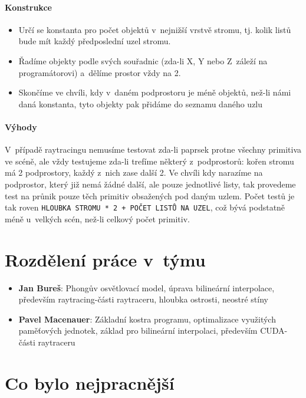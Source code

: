 \documentclass[12pt,a4paper,titlepage,final]{report}
\begin{document}
\paragraph{Konstrukce}
\begin{itemize}
	\item Určí se konstanta pro počet objektů v~nejnižší vrstvě stromu, tj. kolik listů bude mít každý předposlední uzel stromu.
	\item Řadíme objekty podle svých souřadnic (zda-li X, Y nebo Z~záleží na programátorovi) a~dělíme prostor vždy na 2.
	\item Skončíme ve chvíli, kdy v~daném podprostoru je méně objektů, než-li námi daná konstanta, tyto objekty pak přidáme do seznamu daného uzlu
\end{itemize}

\paragraph{Výhody} V~případě raytracingu nemusíme testovat zda-li paprsek protne všechny primitiva ve scéně, ale vždy testujeme zda-li trefíme některý z~podprostorů: kořen stromu má 2 podprostory, každý z~nich zase další 2. Ve chvíli kdy narazíme na podprostor, který již nemá žádné další, ale pouze jednotlivé listy, tak provedeme test na průnik pouze těch primitiv obsažených pod daným uzlem. Počet testů je tak roven \verb|HLOUBKA STROMU * 2 + POČET LISTŮ NA UZEL|, což bývá podstatně méně u~velkých scén, než-li celkový počet primitiv.


\section{Rozdělení práce v~týmu}

\begin{itemize}
\item \textbf{Jan Bureš}: Phongův osvětlovací model, úprava bilineární interpolace, především raytracing-části raytraceru, hloubka ostrosti, neostré stíny
\item \textbf{Pavel Macenauer}: Základní kostra programu, optimalizace využitých paměťových jednotek, základ pro bilineární interpolaci, především CUDA-části raytraceru 
\end{itemize}

\section{Co bylo nejpracnější}
\end{document}
